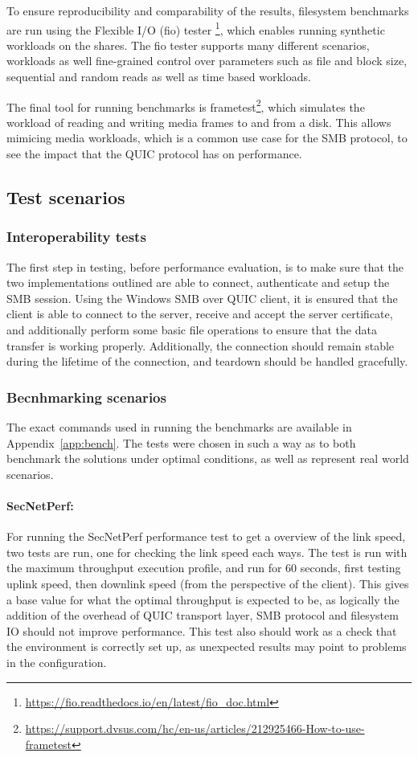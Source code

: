 \documentclass[english, 12pt, a4paper, elec, utf8, a-2b, online]{aaltothesis}
\begin{document}
To ensure reproducibility and comparability of the results, filesystem benchmarks are run
using the Flexible I/O (fio) tester \footnote{\url{https://fio.readthedocs.io/en/latest/fio_doc.html}},
which enables running synthetic workloads on the shares. The fio tester supports
many different scenarios, workloads as well fine-grained control over parameters
such as file and block size, sequential and random reads as well as time based workloads.

The final tool for running benchmarks is frametest\footnote{\url{https://support.dvsus.com/hc/en-us/articles/212925466-How-to-use-frametest}}, which simulates the workload of
reading and writing media frames to and from a disk. This allows mimicing media
workloads, which is a common use case for the SMB protocol, to see the impact that
the QUIC protocol has on performance.

\subsection{Test scenarios}

\subsubsection{Interoperability tests}

The first step in testing, before performance evaluation, is to make sure that
the two implementations outlined are able to connect, authenticate and setup
the SMB session. Using the Windows SMB over QUIC client, it is ensured that the client
is able to connect to the server, receive and accept the server certificate, and
additionally perform some basic file operations to ensure that the data transfer is
working properly. Additionally, the connection should remain stable during the lifetime
of the connection, and teardown should be handled gracefully.

\subsubsection{Becnhmarking scenarios}

The exact commands used in running the benchmarks are available in Appendix~\ref{app:bench}.
The tests were chosen in such a way as to both benchmark the solutions under optimal conditions,
as well as represent real world scenarios.

\paragraph{SecNetPerf:}
For running the SecNetPerf performance test to get a overview of the link speed,
two tests are run, one for checking the link speed each ways. The test is run with the maximum
throughput execution profile, and run for 60 seconds, first testing uplink speed,
then downlink speed (from the perspective of the client). This gives a base value for
what the optimal throughput is expected to be, as logically the addition of the
overhead of QUIC transport layer, SMB protocol and filesystem IO should not improve
performance. This test also should work as a check that the environment is correctly
set up, as unexpected results may point to problems in the configuration.
\end{document}
